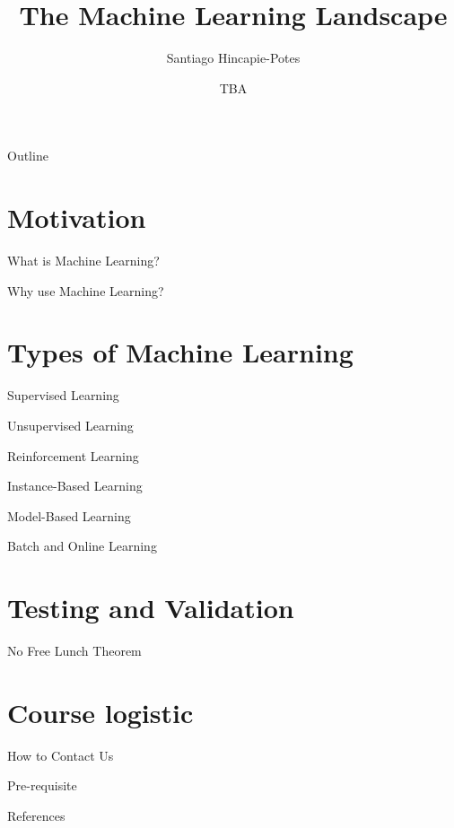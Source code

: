 \documentclass{beamer}
\title{The Machine Learning Landscape}
\author{Santiago Hincapie-Potes}
\institute{Universidad EAFIT}
\date{TBA}
\begin{document}
\begin{frame}
  \titlepage
\end{frame}

\begin{frame}{Outline}
  \tableofcontents
\end{frame}

\section{Motivation}
\begin{frame}{What is Machine Learning?}

\end{frame}

\begin{frame}{Why use Machine Learning?}

\end{frame}

\section{Types of Machine Learning}
\begin{frame}{Supervised Learning}

\end{frame}

\begin{frame}{Unsupervised Learning}

\end{frame}

\begin{frame}{Reinforcement Learning}

\end{frame}

\begin{frame}{Instance-Based Learning}

\end{frame}

\begin{frame}{Model-Based Learning}

\end{frame}

\begin{frame}{Batch and Online Learning}

\end{frame}

\section{Testing and Validation}
\begin{frame}{No Free Lunch Theorem}

\end{frame}

\section{Course logistic}
\begin{frame}{How to Contact Us}

\end{frame}

\begin{frame}{Pre-requisite}

\end{frame}

\begin{frame}{References}

\end{frame}
\end{document}
